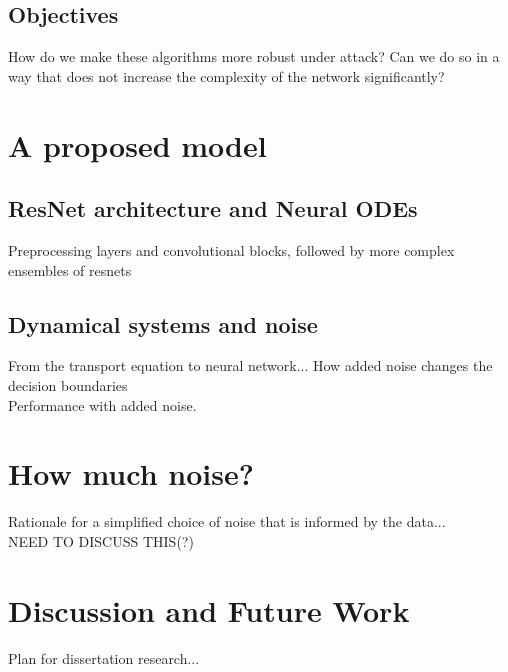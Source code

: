 \documentclass[12pt]{article}
\begin{document}
\subsection{Objectives}
How do we make these algorithms more robust under attack? Can we do so in a way that does not increase the complexity of the network significantly?
\section{A proposed model}
\subsection{ResNet architecture and Neural ODEs}
Preprocessing layers and convolutional blocks, followed by more complex ensembles of resnets
\subsection{Dynamical systems and noise}
From the transport equation to neural network... How added noise changes the decision boundaries \\
Performance with added noise.
\section{How much noise?}
Rationale for a simplified choice of noise that is informed by the data...\\
NEED TO DISCUSS THIS(?)
\section{Discussion and Future Work}
Plan for dissertation research...

\end{document}
